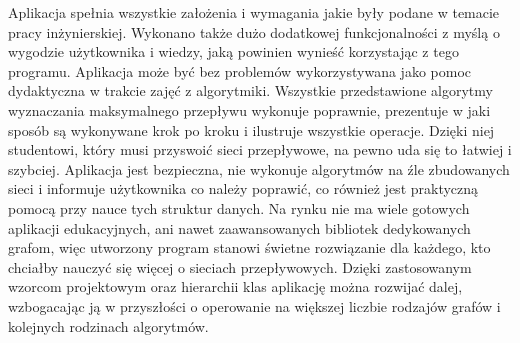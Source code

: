 Aplikacja spełnia wszystkie założenia i wymagania jakie były podane w temacie pracy inżynierskiej. Wykonano także dużo dodatkowej funkcjonalności z myślą o wygodzie użytkownika i wiedzy, jaką powinien wynieść korzystając z tego programu. Aplikacja może być bez problemów wykorzystywana jako pomoc dydaktyczna w trakcie zajęć z algorytmiki. Wszystkie przedstawione algorytmy wyznaczania maksymalnego przepływu wykonuje poprawnie, prezentuje w jaki sposób są wykonywane krok po kroku i ilustruje wszystkie operacje. Dzięki niej studentowi, który musi przyswoić sieci przepływowe, na pewno uda się to łatwiej i szybciej. Aplikacja jest bezpieczna, nie wykonuje algorytmów na źle zbudowanych sieci i informuje użytkownika co należy poprawić, co również jest praktyczną pomocą przy nauce tych struktur danych. Na rynku nie ma wiele gotowych aplikacji edukacyjnych, ani nawet zaawansowanych bibliotek dedykowanych grafom, więc utworzony program stanowi świetne rozwiązanie dla każdego, kto chciałby nauczyć się więcej o sieciach przepływowych. Dzięki zastosowanym wzorcom projektowym oraz hierarchii klas aplikację można rozwijać dalej, wzbogacając ją w przyszłości o operowanie na większej liczbie rodzajów grafów i kolejnych rodzinach algorytmów.